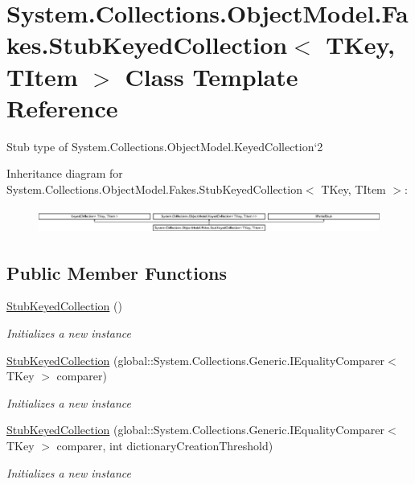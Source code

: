 \hypertarget{class_system_1_1_collections_1_1_object_model_1_1_fakes_1_1_stub_keyed_collection_3_01_t_key_00_01_t_item_01_4}{\section{System.\-Collections.\-Object\-Model.\-Fakes.\-Stub\-Keyed\-Collection$<$ T\-Key, T\-Item $>$ Class Template Reference}
\label{class_system_1_1_collections_1_1_object_model_1_1_fakes_1_1_stub_keyed_collection_3_01_t_key_00_01_t_item_01_4}
}


Stub type of System.\-Collections.\-Object\-Model.\-Keyed\-Collection`2 


Inheritance diagram for System.\-Collections.\-Object\-Model.\-Fakes.\-Stub\-Keyed\-Collection$<$ T\-Key, T\-Item $>$\-:\begin{figure}[H]
\begin{center}
\leavevmode
\includegraphics[height=0.825959cm]{class_system_1_1_collections_1_1_object_model_1_1_fakes_1_1_stub_keyed_collection_3_01_t_key_00_01_t_item_01_4}
\end{center}
\end{figure}
\subsection*{Public Member Functions}
\begin{DoxyCompactItemize}
\item 
\hyperlink{class_system_1_1_collections_1_1_object_model_1_1_fakes_1_1_stub_keyed_collection_3_01_t_key_00_01_t_item_01_4_a8f262f619619ad5fea5b370320c4fd23}{Stub\-Keyed\-Collection} ()
\begin{DoxyCompactList}\small\item\em Initializes a new instance\end{DoxyCompactList}\item 
\hyperlink{class_system_1_1_collections_1_1_object_model_1_1_fakes_1_1_stub_keyed_collection_3_01_t_key_00_01_t_item_01_4_a00446b7ccc1e6c72986f83395f0697c1}{Stub\-Keyed\-Collection} (global\-::\-System.\-Collections.\-Generic.\-I\-Equality\-Comparer$<$ T\-Key $>$ comparer)
\begin{DoxyCompactList}\small\item\em Initializes a new instance\end{DoxyCompactList}\item 
\hyperlink{class_system_1_1_collections_1_1_object_model_1_1_fakes_1_1_stub_keyed_collection_3_01_t_key_00_01_t_item_01_4_a9d189f3997e4e82116f1216815f98b2f}{Stub\-Keyed\-Collection} (global\-::\-System.\-Collections.\-Generic.\-I\-Equality\-Comparer$<$ T\-Key $>$ comparer, int dictionary\-Creation\-Threshold)
\begin{DoxyCompactList}\small\item\em Initializes a new instance\end{DoxyCompactList}\end{DoxyCompactItemize}
